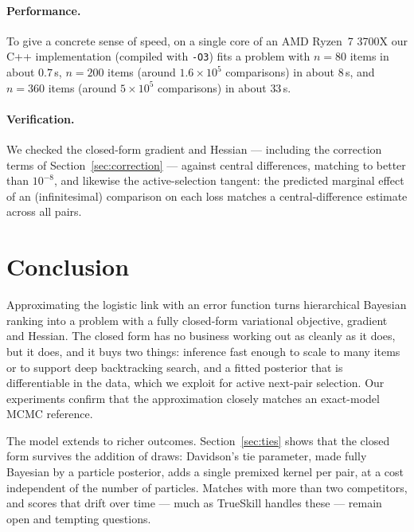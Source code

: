 \documentclass[12pt]{article}
\begin{document}
\paragraph{Performance.}
To give a concrete sense of speed, on a single core of an AMD Ryzen~7 3700X our C++ implementation
(compiled with \texttt{-O3}) fits a problem with $n = 80$ items in about $0.7$\,s, $n = 200$ items
(around $1.6\times10^5$ comparisons) in about $8$\,s, and $n = 360$ items (around $5\times10^5$
comparisons) in about $33$\,s.

\paragraph{Verification.}
We checked the closed-form gradient and Hessian --- including the correction terms of
Section~\ref{sec:correction} --- against central differences, matching to better than $10^{-8}$, and
likewise the active-selection tangent: the predicted marginal effect of an (infinitesimal) comparison on
each loss matches a central-difference estimate across all pairs.


\section*{Conclusion}

Approximating the logistic link with an error function turns hierarchical Bayesian ranking into
a problem with a fully closed-form variational objective, gradient and Hessian. The closed form
has no business working out as cleanly as it does, but it does, and it buys two things: inference
fast enough to scale to many items or to support deep backtracking search, and a fitted posterior
that is differentiable in the data, which we exploit for active next-pair selection. Our
experiments confirm that the approximation closely matches an exact-model MCMC reference.

The model extends to richer outcomes. Section~\ref{sec:ties} shows that the closed form survives
the addition of draws: Davidson's tie parameter, made fully Bayesian by a particle posterior,
adds a single premixed kernel per pair, at a cost independent of the number of particles.
Matches with more than two competitors, and scores that drift over time --- much as TrueSkill
\cite{herbrich2007trueskill} handles these --- remain open and tempting questions.

\printbibliography
\end{document}
